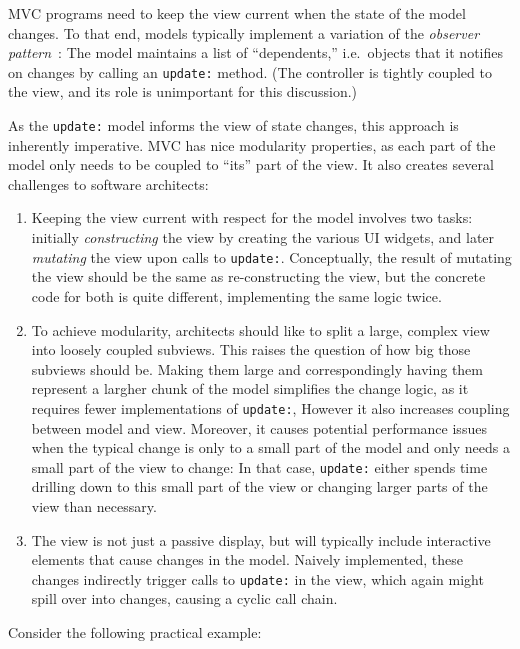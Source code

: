 \documentclass[sigplan,screen]{acmart}
\begin{document}
MVC programs need to keep the view current when the state of the model
changes.  To that end, models typically implement a variation of the
\textit{observer pattern}~\cite{GoF}: The model maintains a list of
``dependents,'' i.e.\ objects that it notifies on changes by calling
an \texttt{update:} method.  (The controller is tightly coupled to the
view, and its role is unimportant for this discussion.)

As the \texttt{update:} model informs the view of state changes, this
approach is inherently imperative.  MVC has nice modularity
properties, as each part of the model only needs to be coupled to
``its'' part of the view.  It also creates several challenges to
software architects:
%
\begin{enumerate}
\item Keeping the view current with respect for the model involves two
  tasks: initially \emph{constructing} the view by creating the
  various UI widgets, and later \emph{mutating} the view upon calls to
  \texttt{update:}.  Conceptually, the result of mutating the view
  should be the same as re-constructing the view, but the concrete
  code for both is quite different, implementing the same logic twice.
\item To achieve modularity, architects should like to split a large,
  complex view into loosely coupled subviews.  This raises the
  question of how big those subviews should be. Making them large and
  correspondingly having them represent a largher chunk of the model
  simplifies the change logic, as it requires fewer implementations of
  \texttt{update:}, However it also increases coupling between model
  and view.  Moreover, it causes potential performance issues when the
  typical change is only to a small part of the model and only needs a
  small part of the view to change: In that case, \texttt{update:}
  either spends time drilling down to this small part of the view or
  changing larger parts of the view than necessary.
\item The view is not just a passive display, but will typically
  include interactive elements that cause changes in the model.
  Naively implemented, these changes indirectly trigger calls to
  \texttt{update:} in the view, which again might spill over into
  changes, causing a cyclic call chain.
\end{enumerate}
%
Consider the following practical example:
%
\end{document}
